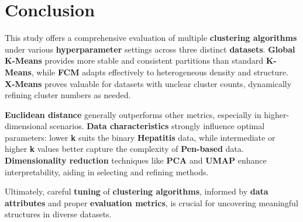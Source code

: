\section{Conclusion}
This study offers a comprehensive evaluation of multiple \textbf{clustering algorithms} under various \textbf{hyperparameter} settings across three distinct \textbf{datasets}. \textbf{Global K-Means} provides more stable and consistent partitions than standard \textbf{K-Means}, while \textbf{FCM} adapts effectively to heterogeneous density and structure. \textbf{X-Means} proves valuable for datasets with unclear cluster counts, dynamically refining cluster numbers as needed.

\textbf{Euclidean distance} generally outperforms other metrics, especially in higher-dimensional scenarios. \textbf{Data characteristics} strongly influence optimal parameters: lower \textbf{k} suits the binary \textbf{Hepatitis} data, while intermediate or higher \textbf{k} values better capture the complexity of \textbf{Pen-based} data. \textbf{Dimensionality reduction} techniques like \textbf{PCA} and \textbf{UMAP} enhance interpretability, aiding in selecting and refining methods.

Ultimately, careful \textbf{tuning} of \textbf{clustering algorithms}, informed by \textbf{data attributes} and proper \textbf{evaluation metrics}, is crucial for uncovering meaningful structures in diverse datasets.